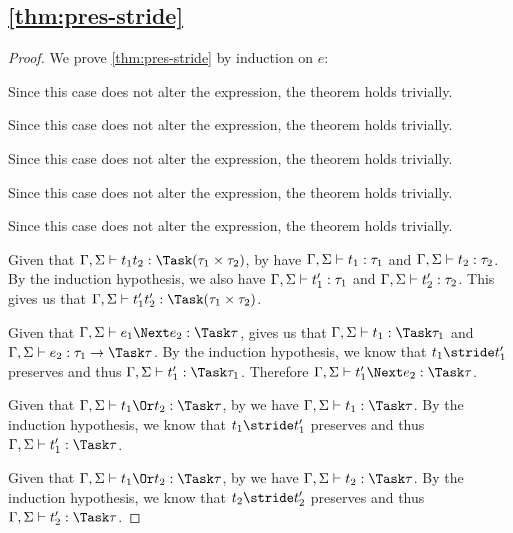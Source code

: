 \subsection{\cref{thm:pres-stride}}

\begin{proof}
  We prove \cref{thm:pres-stride} by induction on $e$:

     {Since this case does not alter the expression, the theorem holds trivially.}

     {Since this case does not alter the expression, the theorem holds trivially.}

     {Since this case does not alter the expression, the theorem holds trivially.}

     {Since this case does not alter the expression, the theorem holds trivially.}

     {Since this case does not alter the expression, the theorem holds trivially.}

     {Given that $\Gamma,\Sigma\infers t_1\And t_2:\Task(\tau_1\times\tau_2)$, by  have $\Gamma,\Sigma\vdash t_1:\tau_1$ and $\Gamma,\Sigma\vdash t_2:\tau_2$.
     By the induction hypothesis, we also have $\Gamma,\Sigma\vdash t_1':\tau_1$ and $\Gamma,\Sigma\vdash t_2':\tau_2$.
     This gives us that $\Gamma,\Sigma\infers t_1'\And t_2':\Task(\tau_1\times\tau_2)$.}

       {Given that
  $\Gamma,\Sigma\infers e_1\Next e_2:\Task \tau$,  gives us that $\Gamma,\Sigma\infers t_1:\Task\tau_1$ and
  $\Gamma,\Sigma\infers e_2:\tau_1 \to \Task \tau$. By the induction hypothesis,
  we know that $t_1\stride t_1'$ preserves and thus
  $\Gamma,\Sigma\infers t_1':\Task\tau_1$. Therefore
  $\Gamma,\Sigma\infers t_1'\Next e_2:\Task\tau$.}

       {Given that
  $\Gamma,\Sigma\infers t_1\Or t_2:\Task\tau$, by  we have
  $\Gamma,\Sigma\infers t_1:\Task\tau$. By the induction hypothesis, we know that
  $t_1\stride t_1'$ preserves and thus $\Gamma,\Sigma\infers t_1':\Task\tau$.}

     {Given that $\Gamma,\Sigma\infers t_1\Or t_2:\Task\tau$, by  we have $\Gamma,\Sigma\infers t_2:\Task\tau$.
     By the induction hypothesis, we know that $t_2\stride t_2'$ preserves and thus $\Gamma,\Sigma\infers t_2':\Task\tau$.}


\end{proof}

